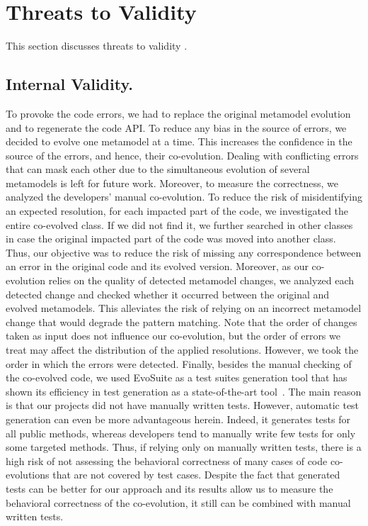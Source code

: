 \section{Threats to Validity}\label{ch1_threat}
\noindent This section discusses threats to validity \cite{wohlin2012experimentation}.

\subsection{Internal Validity.} To provoke the code errors, we had to replace the original metamodel evolution and to regenerate the code API. To reduce any bias in the source of errors, we decided to evolve one metamodel at a time. This increases the confidence in the source of the errors, and hence, their co-evolution. Dealing with conflicting errors that can mask each other due to the simultaneous evolution of several metamodels is left for future work.  
Moreover, to measure the correctness, we analyzed the developers' manual co-evolution.
To reduce the risk of misidentifying an expected resolution, for each impacted part of the code, we investigated the entire co-evolved class. If we did not find it, we further searched in other classes in case the original impacted part of the code was moved into another class. Thus, our objective was to reduce the risk of missing any correspondence between an error in the original code and its evolved version. Moreover, as our co-evolution relies on the quality of detected metamodel changes, we analyzed each detected change and checked whether it occurred between the original and evolved metamodels. This alleviates the risk of relying on an incorrect metamodel change that would degrade the pattern matching. 
Note that the order of changes taken as input does not influence our co-evolution, but the order of errors we treat may affect the distribution of the applied resolutions. However, we took the order in which the errors were detected. 
Finally, besides the manual checking of the co-evolved code, we used EvoSuite as a test suites generation tool that has shown its efficiency in
test generation as a state-of-the-art tool~\cite{DANGLOT2019110398,https://doi.org/10.1002/stvr.1601}. The main reason is that our projects did not have manually written tests. However, automatic test
generation can even be more advantageous herein. Indeed, it generates tests for all
public methods, whereas developers tend to manually write few tests for only some targeted methods. Thus, if relying only on manually written tests, there is a high risk of not assessing the behavioral correctness of many cases of code co-evolutions that are not covered by test cases. Despite the fact that generated tests can be better for our approach and its results allow us to measure the behavioral correctness of the co-evolution, %
it still can be combined with manual written tests.


